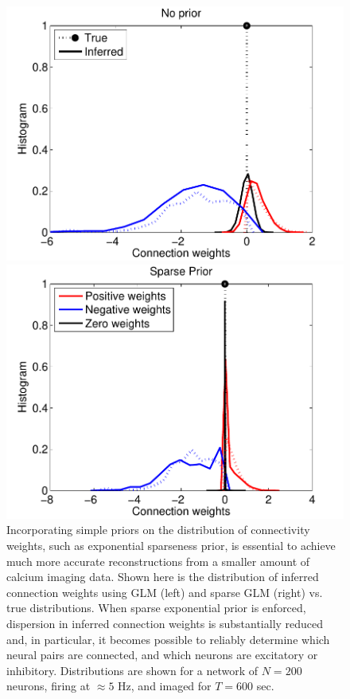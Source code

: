 \begin{figure}[h]
\centering
\begin{minipage}[c]{0.45\hsize}
\includegraphics[width=\hsize]{../figs/FigureA3_hist_glm200}
\end{minipage}
\begin{minipage}[c]{0.45\hsize}
\includegraphics[width=\hsize]{../figs/FigureA3_hist_spa200}
\end{minipage}
\caption{
Incorporating simple priors on the distribution of connectivity weights, such as exponential sparseness prior, is essential to achieve much more accurate reconstructions from a smaller amount of calcium imaging data.
Shown here is the distribution of inferred connection weights using GLM (left) and sparse GLM (right) vs. true distributions. When sparse exponential prior is enforced, dispersion in inferred connection weights is substantially reduced and, in particular, it becomes possible to reliably determine which neural pairs are connected, and which neurons are excitatory or inhibitory. Distributions are shown for a network of $N=200$ neurons, firing at $\approx 5$ Hz, and imaged for $T=600$ sec.}
\label{fig:distros}
\end{figure}

